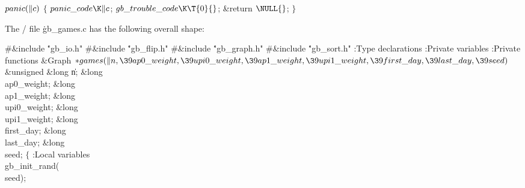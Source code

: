 \Y\B\4\D$\\{panic}(\|c)$ \5
${}\{{}$\5
\1${}\\{panic\_code}\K\|c{}$;\5
${}\\{gb\_trouble\_code}\K\T{0}{}$;\5
\&{return} ${}\NULL{}$;\5
${}\}{}$\2\par
\fi

The \CEE/ file \.{gb\_games.c} has the following overall shape:

\Y\B\8\#\&{include} \.{"gb\_io.h"}\6
\8\#\&{include} \.{"gb\_flip.h"}\6
\8\#\&{include} \.{"gb\_graph.h"}\6
\8\#\&{include} \.{"gb\_sort.h"}\6
\ATH\7
:Type declarations\X\6
:Private variables\X\6
:Private functions\X\7
\1\1\&{Graph} ${}{*}\\{games}(\|n,\39\\{ap0\_weight},\39\\{upi0\_weight},\39%
\\{ap1\_weight},\39\\{upi1\_weight},\39\\{first\_day},\39\\{last\_day},\39%
\\{seed}){}$\6
\&{unsigned} \&{long} \|n;\6
\&{long} \\{ap0\_weight};\6
\&{long} \\{ap1\_weight};\6
\&{long} \\{upi0\_weight};\6
\&{long} \\{upi1\_weight};\6
\&{long} \\{first\_day};\6
\&{long} \\{last\_day};\6
\&{long} \\{seed};\2\2\6
${}\{{}$\5
\1:Local variables\X\7
\\{gb\_init\_rand}(\\{seed});\6
